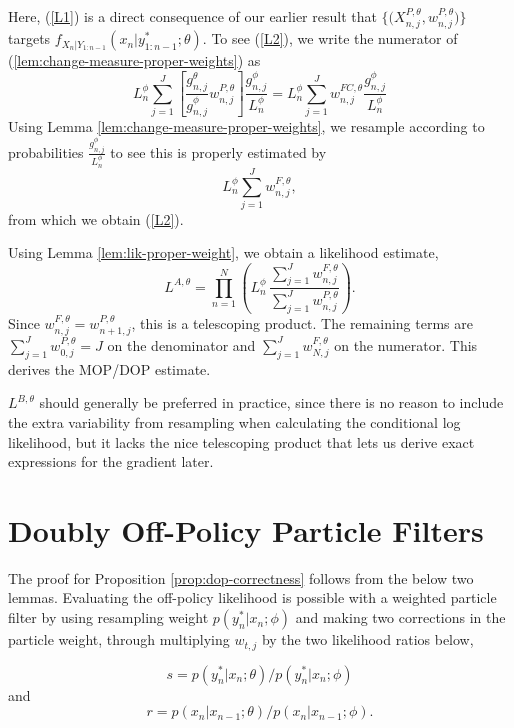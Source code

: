 \documentclass{article}
\begin{document}
Here, (\ref{L1}) is a direct consequence of our earlier result that $\{ \big(X^{P,\theta}_{n,j},w^{P,\theta}_{n,j}\big) \}$ targets $f_{X_{n}|Y_{1:n-1}}(x_{n}|y^*_{1:n-1};\theta)$.
To see  (\ref{L2}),
we write the numerator of (\ref{lem:change-measure-proper-weights}) as
\[
L^\phi_n \sum_{j=1}^J \left[ \frac{g^\theta_{n,j}}{g^\phi_{n,j}} w^{P,\theta}_{n,j}\right] \frac{g^\phi_{n,j}}{L_n^\phi}
= L^\phi_n \sum_{j=1}^J w_{n,j}^{FC,\theta} \frac{g^\phi_{n,j}}{L_n^\phi}
\]
Using Lemma \ref{lem:change-measure-proper-weights}, we resample according to probabilities $\frac{g^\phi_{n,j}}{L_n^\phi}$ to see this is properly estimated by
\[
L^\phi_n \sum_{j=1}^J w^{F,\theta}_{n,j},
\]
from which we obtain (\ref{L2}).

Using Lemma \ref{lem:lik-proper-weight}, we obtain a likelihood estimate,
\[
L^{A,\theta} = \prod_{n=1}^N \left( L^\phi_n \, \frac{\sum_{j=1}^J w^{F,\theta}_{n,j}}{\sum_{j=1}^J w^{P,\theta}_{n,j}}\right).
\]
Since $w^{F,\theta}_{n,j}=w^{P,\theta}_{n+1,j}$, this is a telescoping product. The remaining terms are
$\sum_{j=1}^J w^{P,\theta}_{0,j} = J$ on the denominator and $\sum_{j=1}^J w^{F,\theta}_{N,j}$ on the numerator.
This derives the MOP/DOP estimate.


$L^{B,\theta}$ should generally be preferred in practice, since there is no reason to include the extra variability from resampling when calculating the conditional log likelihood, but it lacks the nice telescoping product that lets us derive exact expressions for the gradient later.



\section{Doubly Off-Policy Particle Filters}
\label{app:dop}


The proof for Proposition \ref{prop:dop-correctness} follows from the below two lemmas. Evaluating the off-policy likelihood is possible with a weighted particle filter by using resampling weight $p(y^*_n|x_n;\phi)$ and making two corrections in the particle weight, through multiplying $w_{t,j}$ by the two likelihood ratios below,

\begin{equation}
    \label{eq:dmeas-ratio}
    s=p(y^*_n|x_n;\theta)/p(y^*_n|x_n;\phi)
\end{equation}
and
\begin{equation}
    \label{eq:rproc-ratio}
    r=p(x_n|x_{n-1};\theta)/p(x_n|x_{n-1};\phi).
\end{equation}
\end{document}
